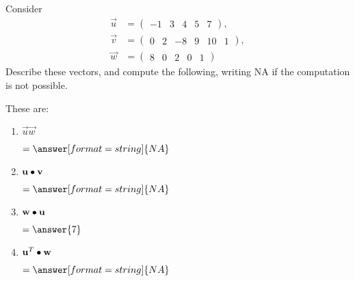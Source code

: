 \documentclass{ximera}
\author{Parisa Fatheddin}
\begin{document}
\begin{exercise}

Consider
\begin{align*}
  \vec{u} &= \begin{pmatrix} -1 & 3 & 4 & 5 & 7
  \end{pmatrix},\\
  \vec{v} &= \begin{pmatrix}
0 & 2 & -8 & 9 & 10 & 1
  \end{pmatrix},\\
  \vec{w} &= \begin{pmatrix}
8 & 0 & 2 & 0 & 1
\end{pmatrix}
\end{align*}
Describe these vectors, and compute the following, writing NA if the
computation is not possible.  \begin{prompt}These are:
  \begin{multipleChoice}
    \pdfOnly{\end{multicols}}
  \end{multipleChoice}
\end{prompt}
  \begin{enumerate}
  \item $\vec{u}\vec{w}$ \begin{prompt} $= \answer[format=string]{NA}$\end{prompt}
  \item $\mathbf{u} \bullet \mathbf{v}$ \begin{prompt} $= \answer[format=string]{NA}$\end{prompt}
  \item $\mathbf{w} \bullet \mathbf{u}$ \begin{prompt} $= \answer{7}$\end{prompt}
  \item $\mathbf{u}^{T} \bullet \mathbf{w}$ \begin{prompt} $= \answer[format=string]{NA}$\end{prompt}
      \pdfOnly{\end{multicols}}
      \end{enumerate}
\end{exercise}
\end{document}

